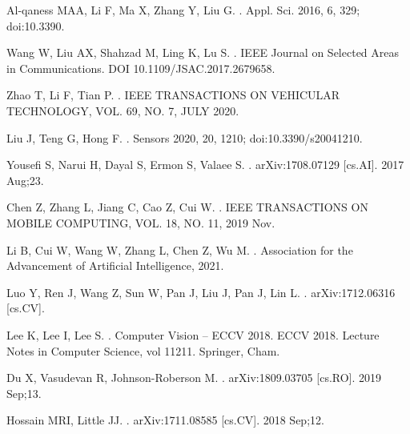 \documentclass[10pt,letterpaper]{article}
\begin{document}
\begin{thebibliography}{10}
		
		Al-qaness MAA, Li F, Ma X, Zhang Y, Liu G.
		.
		\newblock Appl. Sci. 2016, 6, 329; doi:10.3390.
		
		Wang W, Liu AX, Shahzad M, Ling K, Lu S.
		.
		\newblock  IEEE Journal
		on Selected Areas in Communications. DOI 10.1109/JSAC.2017.2679658.
		
		Zhao T, Li F, Tian P.
		.
		\newblock IEEE TRANSACTIONS ON VEHICULAR TECHNOLOGY, VOL. 69, NO. 7, JULY 2020.
		
		Liu J, Teng G, Hong F.
		.
		\newblock Sensors 2020, 20, 1210; doi:10.3390/s20041210.
		
		Yousefi S, Narui H, Dayal S, Ermon S, Valaee S.
		.
		\newblock arXiv:1708.07129 [cs.AI]. 2017 Aug;23.
		
		Chen Z, Zhang L, Jiang C, Cao Z, Cui W.
		.
		\newblock  IEEE TRANSACTIONS ON MOBILE COMPUTING, VOL. 18, NO. 11, 2019 Nov.
		
		Li B, Cui W, Wang W, Zhang L, Chen Z, Wu M.
		.
		\newblock Association for the Advancement of Artificial
		Intelligence, 2021.
		
		Luo Y, Ren J, Wang Z, Sun W, Pan J, Liu J, Pan J, Lin L.
		.
		\newblock arXiv:1712.06316 [cs.CV].
		
		Lee K, Lee I, Lee S.
		.
		\newblock Computer Vision – ECCV 2018. ECCV 2018. Lecture Notes in Computer Science, vol 11211. Springer, Cham.
		
		Du X, Vasudevan R, Johnson-Roberson M.
		.
		\newblock arXiv:1809.03705 [cs.RO]. 2019 Sep;13.
		
		Hossain MRI, Little JJ.
		.
		\newblock arXiv:1711.08585 [cs.CV]. 2018 Sep;12.
		

\end{thebibliography}
\end{document}
